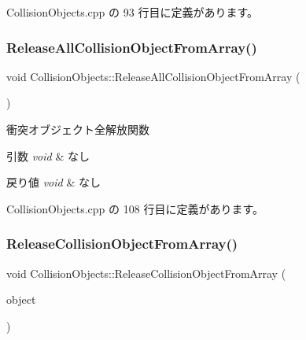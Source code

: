  Collision\+Objects.\+cpp の 93 行目に定義があります。

\mbox{\label{class_collision_objects_a2efe32f283fe9b2a30ff8d1e370f152d}} 
\subsubsection{\texorpdfstring{Release\+All\+Collision\+Object\+From\+Array()}{ReleaseAllCollisionObjectFromArray()}}
{\footnotesize\ttfamily void Collision\+Objects\+::\+Release\+All\+Collision\+Object\+From\+Array (\begin{DoxyParamCaption}{ }\end{DoxyParamCaption})}



衝突オブジェクト全解放関数 


\begin{DoxyParams}{引数}
{\em void} & なし \\
\hline
\end{DoxyParams}

\begin{DoxyRetVals}{戻り値}
{\em void} & なし \\
\hline
\end{DoxyRetVals}


 Collision\+Objects.\+cpp の 108 行目に定義があります。

\mbox{\label{class_collision_objects_a38bfe55a93549c90d416c0d1d560932b}} 
\subsubsection{\texorpdfstring{Release\+Collision\+Object\+From\+Array()}{ReleaseCollisionObjectFromArray()}}
{\footnotesize\ttfamily void Collision\+Objects\+::\+Release\+Collision\+Object\+From\+Array (\begin{DoxyParamCaption}\item[{\mbox{\hyperlink{class_collision_object}{Collision\+Object}} $\ast$}]{object }\end{DoxyParamCaption})}




